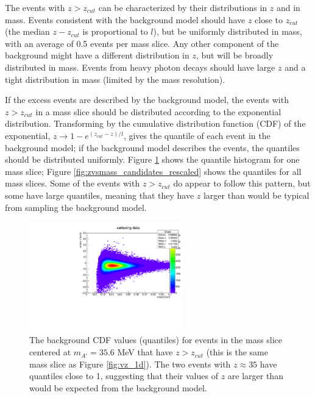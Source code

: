 The events with $z>z_{cut}$ can be characterized by their distributions in $z$ and in mass.
Events consistent with the background model should have $z$ close to $z_{cut}$ (the median $z-z_{cut}$ is proportional to $l$), but be uniformly distributed in mass, with an average of 0.5 events per mass slice.
Any other component of the background might have a different distribution in $z$, but will be broadly distributed in mass.
Events from heavy photon decays should have large $z$ and a tight distribution in mass (limited by the mass resolution).

If the excess events are described by the background model, the events with $z>z_{cut}$ in a mass slice should be distributed according to the exponential distribution.
Transforming by the cumulative distribution function (CDF) of the exponential, $z\to 1-e^{(z_{cut}-z)/l}$, gives the quantile of each event in the background model; if the background model describes the events, the quantiles should be distributed uniformly.
Figure \ref{fig:candidates_rescaled} shows the quantile histogram for one mass slice; Figure \ref{fig:zvsmass_candidates_rescaled} shows the quantiles for all mass slices.
Some of the events with $z>z_{cut}$ do appear to follow this pattern, but some have large quantiles, meaning that they have $z$ larger than would be typical from sampling the background model.

\begin{figure}[ht]
\begin{center}
    \includegraphics[width=0.6\textwidth,page=60,angle=-90]{vertexing/figs/golden_mres}
\end{center}
\caption{The background CDF values (quantiles) for events in the mass slice centered at $m_{A'}=35.6$ MeV that have $z>z_{cut}$ (this is the same mass slice as Figure \ref{fig:vz_1d}).
The two events with $z\approx 35$ have quantiles close to 1, suggesting that their values of $z$ are larger than would be expected from the background model.}
    \label{fig:candidates_rescaled}
\end{figure}

